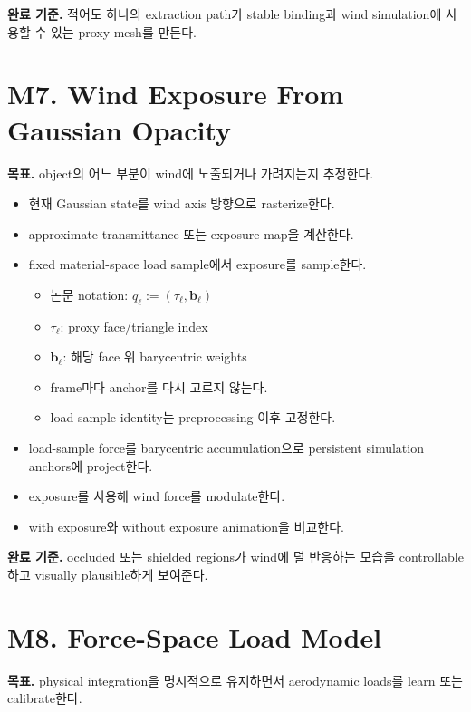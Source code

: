\documentclass[10pt]{article}
\begin{document}
\textbf{완료 기준.} 적어도 하나의 extraction path가 stable binding과 wind simulation에 사용할 수 있는 proxy mesh를 만든다.

\section{M7. Wind Exposure From Gaussian Opacity}

\textbf{목표.} object의 어느 부분이 wind에 노출되거나 가려지는지 추정한다.

\begin{itemize}
  \item 현재 Gaussian state를 wind axis 방향으로 rasterize한다.
  \item approximate transmittance 또는 exposure map을 계산한다.
  \item fixed material-space load sample에서 exposure를 sample한다.
    \begin{itemize}
      \item 논문 notation: \(q_\ell := (\tau_\ell,\mathbf{b}_\ell)\)
      \item \(\tau_\ell\): proxy face/triangle index
      \item \(\mathbf{b}_\ell\): 해당 face 위 barycentric weights
      \item frame마다 anchor를 다시 고르지 않는다.
      \item load sample identity는 preprocessing 이후 고정한다.
    \end{itemize}
  \item load-sample force를 barycentric accumulation으로 persistent simulation anchors에 project한다.
  \item exposure를 사용해 wind force를 modulate한다.
  \item with exposure와 without exposure animation을 비교한다.
\end{itemize}

\textbf{완료 기준.} occluded 또는 shielded regions가 wind에 덜 반응하는 모습을 controllable하고 visually plausible하게 보여준다.

\section{M8. Force-Space Load Model}

\textbf{목표.} physical integration을 명시적으로 유지하면서 aerodynamic loads를 learn 또는 calibrate한다.
\end{document}
